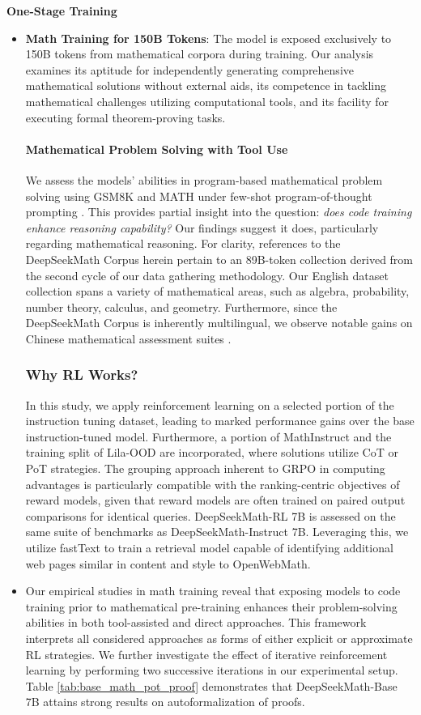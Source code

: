 \textbf{One-Stage Training}

\begin{itemize}[topsep=0pt]
    \item \textbf{Math Training for 150B Tokens}: The model is exposed exclusively to 150B tokens from mathematical corpora during training. Our analysis examines its aptitude for independently generating comprehensive mathematical solutions without external aids, its competence in tackling mathematical challenges utilizing computational tools, and its facility for executing formal theorem-proving tasks. \paragraph{Mathematical Problem Solving with Tool Use} We assess the models’ abilities in program-based mathematical problem solving using GSM8K and MATH under few-shot program-of-thought prompting \citep{pot,pal}. This provides partial insight into the question: \textit{does code training enhance reasoning capability?} Our findings suggest it does, particularly regarding mathematical reasoning. For clarity, references to the DeepSeekMath Corpus herein pertain to an 89B-token collection derived from the second cycle of our data gathering methodology. Our English dataset collection spans a variety of mathematical areas, such as algebra, probability, number theory, calculus, and geometry. Furthermore, since the DeepSeekMath Corpus is inherently multilingual, we observe notable gains on Chinese mathematical assessment suites \citep{wei2023cmath,agieval}. \subsubsection{Why RL Works?}  
In this study, we apply reinforcement learning on a selected portion of the instruction tuning dataset, leading to marked performance gains over the base instruction-tuned model. Furthermore, a portion of MathInstruct \citep{MathInstruct} and the training split of Lila-OOD \citep{lila} are incorporated, where solutions utilize CoT or PoT strategies. The grouping approach inherent to GRPO in computing advantages is particularly compatible with the ranking-centric objectives of reward models, given that reward models are often trained on paired output comparisons for identical queries. DeepSeekMath-RL 7B is assessed on the same suite of benchmarks as DeepSeekMath-Instruct 7B. Leveraging this, we utilize fastText \citep{joulin2016fasttext} to train a retrieval model capable of identifying additional web pages similar in content and style to OpenWebMath. \item Our empirical studies in math training reveal that exposing models to code training prior to mathematical pre-training enhances their problem-solving abilities in both tool-assisted and direct approaches. This framework interprets all considered approaches as forms of either explicit or approximate RL strategies. We further investigate the effect of iterative reinforcement learning by performing two successive iterations in our experimental setup. Table \ref{tab:base_math_pot_proof} demonstrates that DeepSeekMath-Base 7B attains strong results on autoformalization of proofs. \end{itemize}

